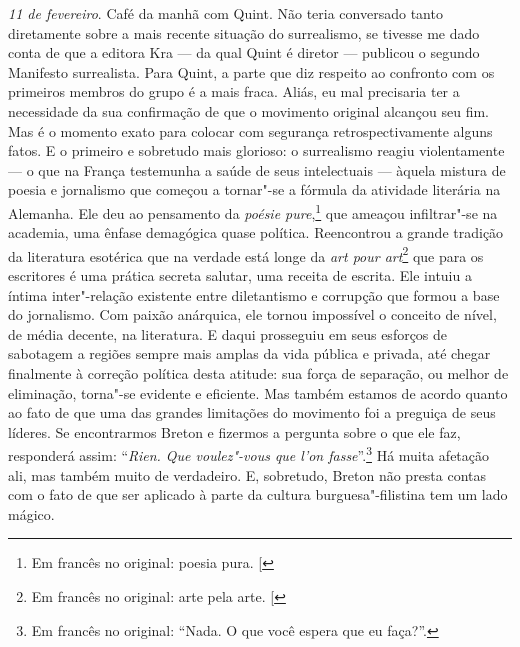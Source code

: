 \emph{11 de fevereiro}. Café da manhã com Quint. Não teria conversado
tanto diretamente sobre a mais recente situação do surrealismo, se
tivesse me dado conta de que a editora Kra --- da qual Quint é diretor ---
publicou o segundo Manifesto surrealista. Para Quint, a parte que diz
respeito ao confronto com os primeiros membros do grupo é a mais fraca.
Aliás, eu mal precisaria ter a necessidade da sua confirmação de que o
movimento original alcançou seu fim. Mas é o momento exato para colocar
com segurança retrospectivamente alguns fatos. E o primeiro e sobretudo
mais glorioso: o surrealismo reagiu violentamente --- o que na França
testemunha a saúde de seus intelectuais --- àquela mistura de poesia e
jornalismo que começou a tornar"-se a fórmula da atividade literária na
Alemanha. Ele deu ao pensamento da \emph{poésie pure},\footnote{Em francês no original: poesia pura. {[}\versal{N. T.}{]}} que ameaçou
infiltrar"-se na academia, uma ênfase demagógica quase política.
Reencontrou a grande tradição da literatura esotérica que na verdade
está longe da \emph{art pour art}\footnote{Em francês no original: arte pela arte. {[}\versal{N. T.}{]}} que para os escritores é uma prática
secreta salutar, uma receita de escrita. Ele intuiu a íntima
inter"-relação existente entre diletantismo e corrupção que formou a base
do jornalismo. Com paixão anárquica, ele tornou impossível o conceito de
nível, de média decente, na literatura. E daqui prosseguiu em seus
esforços de sabotagem a regiões sempre mais amplas da vida pública e
privada, até chegar finalmente à correção política desta atitude: sua força de
separação, ou melhor de eliminação, torna"-se evidente e eficiente. Mas
também estamos de acordo quanto ao fato de que uma das grandes
limitações do movimento foi a preguiça de seus líderes. Se encontrarmos
Breton e fizermos a pergunta sobre o que ele faz, responderá assim: ``\emph{Rien.
Que voulez"-vous que l'on fasse}''.\footnote{Em francês no original: ``Nada. O que você espera que eu faça?''. \versal{[N. T.]}} Há muita afetação ali, mas
também muito de verdadeiro. E, sobretudo, Breton não presta contas com o
fato de que ser aplicado à parte da cultura burguesa"-filistina tem um
lado mágico.

